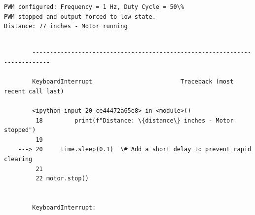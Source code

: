 \documentclass[11pt]{article}
\begin{document}
    \begin{Verbatim}[commandchars=\\\{\}]
PWM configured: Frequency = 1 Hz, Duty Cycle = 50\%
PWM stopped and output forced to low state.
Distance: 77 inches - Motor running

    \end{Verbatim}

    \begin{Verbatim}[commandchars=\\\{\}]

        ---------------------------------------------------------------------------

        KeyboardInterrupt                         Traceback (most recent call last)

        <ipython-input-20-ce44472a65e8> in <module>()
         18         print(f"Distance: \{distance\} inches - Motor stopped")
         19 
    ---> 20     time.sleep(0.1)  \# Add a short delay to prevent rapid clearing
         21 
         22 motor.stop()


        KeyboardInterrupt: 

    \end{Verbatim}


    
    
    
    
\end{document}
